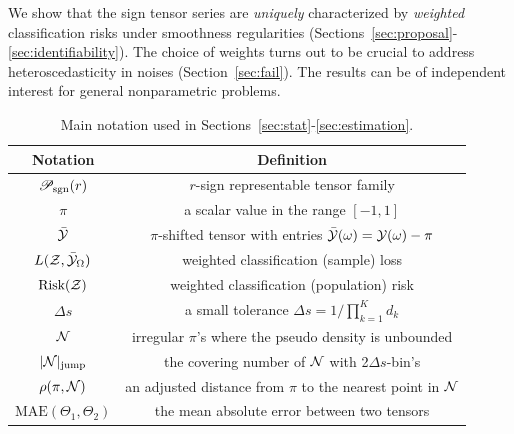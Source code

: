 \documentclass[twoside,11pt]{article}
\theoremstyle{definition}
\def\caliP{\mathscr{P}_{\textup{sgn}}}
\def\risk{\textup{Risk}}
\begin{document}
We show that the sign tensor series are \emph{uniquely} characterized by \emph{weighted} classification risks under smoothness regularities (Sections~\ref{sec:proposal}-\ref{sec:identifiability}). The choice of weights turns out to be crucial to address heteroscedasticity in noises (Section~\ref{sec:fail}). The results can be of independent interest for general nonparametric problems. 

 
 

\begin{table}[h]
    \centering
    \begin{tabular}{c c}
    \toprule
        Notation &  Definition \\\midrule
        $\caliP(r)$ & $r$-sign representable tensor family\\
        $\pi $ & a scalar value in the range $[-1,1]$\\
         $\bar {\mathcal{Y}}$ & $\pi$-shifted tensor with entries $\bar{\mathcal{Y}}(\omega) = \mathcal{Y}(\omega)-\pi$\\
         $L(\mathcal{Z},\bar{\mathcal{Y}}_\Omega)$& weighted classification (sample) loss \\
         $\text{Risk}(\mathcal{Z})$ & weighted classification (population) risk \\
         $\Delta s$ & a small tolerance $\Delta s = 1/\prod_{k=1}^K d_k$\\
         $\mathcal{N}$ & irregular $\pi$'s where the pseudo density is unbounded\\
         $|\mathcal{N}|_{\text{jump}}$ & the covering number of $\mathcal{N}$ with  2$\Delta s$-bin's\\
         $\rho(\pi,\mathcal{N})$ & an adjusted distance from $\pi$ to the nearest point in $\mathcal{N}$\\
         $\text{MAE}(\Theta_1,\Theta_2)$ & the mean absolute error between two tensors\\
         \bottomrule
    \end{tabular}
    \caption{Main notation used in Sections~\ref{sec:stat}-\ref{sec:estimation}.}
    \label{tb:not}
\end{table}
 
\end{document}
